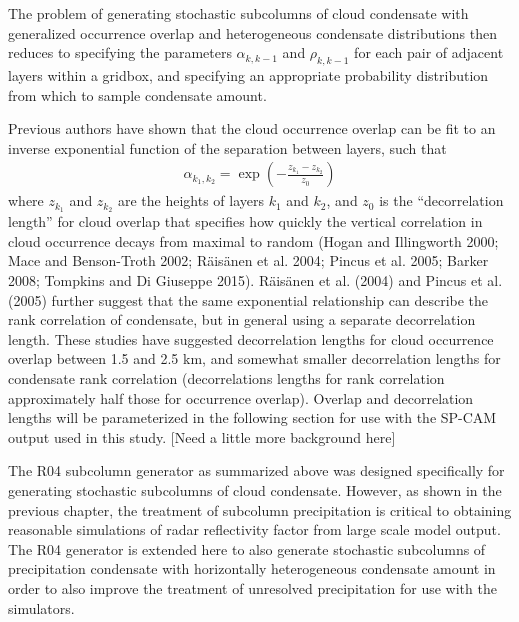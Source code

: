 The problem of generating stochastic subcolumns of cloud condensate with
generalized occurrence overlap and heterogeneous condensate
distributions then reduces to specifying the parameters
\(\alpha_{k, k-1}\) and \(\rho_{k, k-1}\) for each pair of adjacent
layers within a gridbox, and specifying an appropriate probability
distribution from which to sample condensate amount.

Previous authors have shown that the cloud occurrence overlap can be fit
to an inverse exponential function of the separation between layers,
such that \[\begin{gathered}
    \alpha_{k_1, k_2} = \exp\left(-\frac{z_{k_1} - z_{k_2}}{z_0}\right)
    \label{alpha_exponential_equation}\end{gathered}\] where \(z_{k_1}\)
and \(z_{k_2}\) are the heights of layers \(k_1\) and \(k_2\), and
\(z_0\) is the ``decorrelation length'' for cloud overlap that specifies
how quickly the vertical correlation in cloud occurrence decays from
maximal to random (Hogan and Illingworth 2000; Mace and Benson-Troth
2002; Räisänen et al. 2004; Pincus et al. 2005; Barker 2008; Tompkins
and Di Giuseppe 2015). Räisänen et al. (2004) and Pincus et al. (2005)
further suggest that the same exponential relationship can describe the
rank correlation of condensate, but in general using a separate
decorrelation length. These studies have suggested decorrelation lengths
for cloud occurrence overlap between 1.5 and 2.5 km, and somewhat
smaller decorrelation lengths for condensate rank correlation
(decorrelations lengths for rank correlation approximately half those
for occurrence overlap). Overlap and decorrelation lengths will be
parameterized in the following section for use with the SP-CAM output
used in this study. {[}Need a little more background here{]}

The R04 subcolumn generator as summarized above was designed
specifically for generating stochastic subcolumns of cloud condensate.
However, as shown in the previous chapter, the treatment of subcolumn
precipitation is critical to obtaining reasonable simulations of radar
reflectivity factor from large scale model output. The R04 generator is
extended here to also generate stochastic subcolumns of precipitation
condensate with horizontally heterogeneous condensate amount in order to
also improve the treatment of unresolved precipitation for use with the
simulators.

